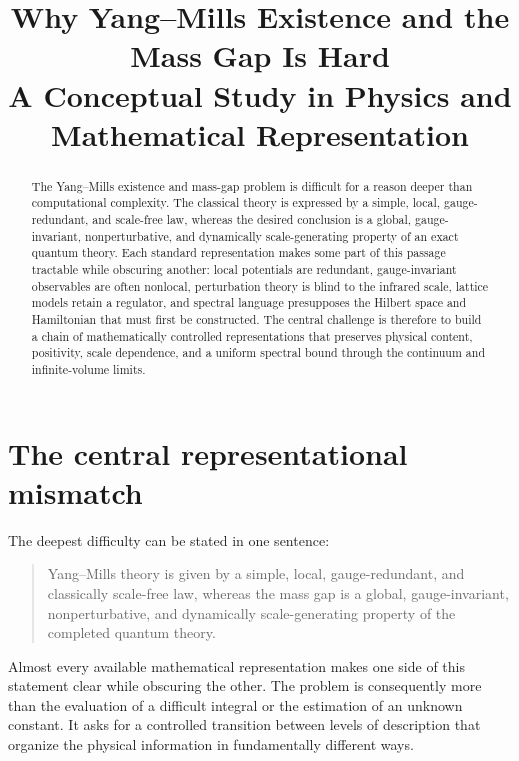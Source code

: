 \documentclass[11pt]{article}
\title{Why Yang--Mills Existence and the Mass Gap Is Hard\\
\large A Conceptual Study in Physics and Mathematical Representation}
\author{}
\date{}
\begin{document}
\maketitle

\begin{abstract}
The Yang--Mills existence and mass-gap problem is difficult for a reason deeper
than computational complexity.  The classical theory is expressed by a simple,
local, gauge-redundant, and scale-free law, whereas the desired conclusion is a
global, gauge-invariant, nonperturbative, and dynamically scale-generating
property of an exact quantum theory.  Each standard representation makes some
part of this passage tractable while obscuring another: local potentials are
redundant, gauge-invariant observables are often nonlocal, perturbation theory is
blind to the infrared scale, lattice models retain a regulator, and spectral
language presupposes the Hilbert space and Hamiltonian that must first be
constructed.  The central challenge is therefore to build a chain of
mathematically controlled representations that preserves physical content,
positivity, scale dependence, and a uniform spectral bound through the
continuum and infinite-volume limits.
\end{abstract}

\section{The central representational mismatch}

The deepest difficulty can be stated in one sentence:

\begin{quote}
Yang--Mills theory is given by a simple, local, gauge-redundant, and
classically scale-free law, whereas the mass gap is a global, gauge-invariant,
nonperturbative, and dynamically scale-generating property of the completed
quantum theory.
\end{quote}

Almost every available mathematical representation makes one side of this
statement clear while obscuring the other.  The problem is consequently more
than the evaluation of a difficult integral or the estimation of an unknown
constant.  It asks for a controlled transition between levels of description
that organize the physical information in fundamentally different ways.
\end{document}
